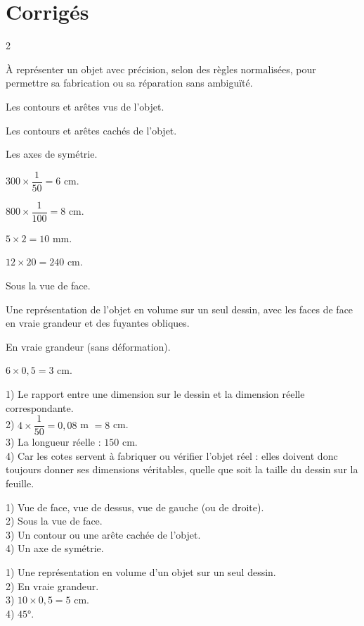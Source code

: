 \section{Corrigés}
\begin{multicols}{2}

À représenter un objet avec précision, selon des règles normalisées, pour permettre sa
fabrication ou sa réparation sans ambiguïté.

Les contours et arêtes vus de l'objet.

Les contours et arêtes cachés de l'objet.

Les axes de symétrie.

$300\times\dfrac1{50}=6$ cm.

$800\times\dfrac1{100}=8$ cm.

$5\times2=10$ mm.

$12\times20=240$ cm.

Sous la vue de face.

Une représentation de l'objet en volume sur un seul dessin, avec les faces de face en
vraie grandeur et des fuyantes obliques.

En vraie grandeur (sans déformation).

$6\times0{,}5=3$ cm.

1) Le rapport entre une dimension sur le dessin et la dimension réelle correspondante.\\
2) $4\times\dfrac1{50}=0{,}08$ m $=8$ cm.\\
3) La longueur réelle : $150$ cm.\\
4) Car les cotes servent à fabriquer ou vérifier l'objet réel : elles doivent donc
toujours donner ses dimensions véritables, quelle que soit la taille du dessin sur la
feuille.

1) Vue de face, vue de dessus, vue de gauche (ou de droite).\\
2) Sous la vue de face.\\
3) Un contour ou une arête cachée de l'objet.\\
4) Un axe de symétrie.

1) Une représentation en volume d'un objet sur un seul dessin.\\
2) En vraie grandeur.\\
3) $10\times0{,}5=5$ cm.\\
4) $45°$.

\end{multicols}
\exercicesBanner
